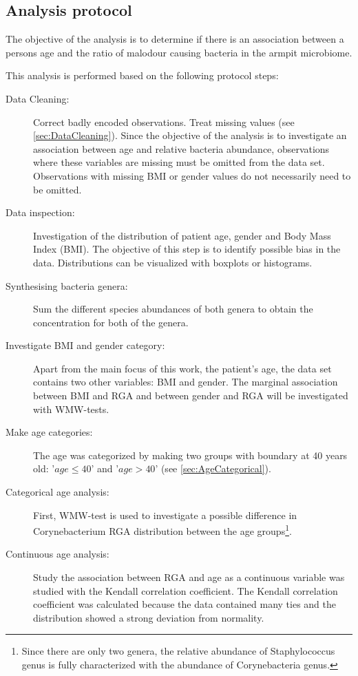 \subsection{Analysis protocol}

The objective of the analysis is to determine if there is an association between a persons age and the ratio of malodour causing bacteria in the armpit microbiome.

This analysis is performed based on the following protocol steps:

\begin{description}
    \item[Data Cleaning:] Correct badly encoded observations. Treat missing values (see \ref{sec:DataCleaning}). Since the objective of the analysis is to investigate an association between age and relative bacteria abundance, observations where these variables are missing must be omitted from the data set. Observations with missing BMI or gender values do not necessarily need to be omitted.
    \item[Data inspection: ] Investigation of the distribution of patient age, gender and Body Mass Index (BMI). 
    The objective of this step is to identify possible bias in the data. 
    Distributions can be visualized with boxplots or histograms.
    \item[Synthesising bacteria genera: ] Sum the different species abundances of both genera to obtain the concentration for both of the genera.
    \item[Investigate BMI and gender category: ] Apart from the main focus of this work, the patient's age, the data set contains two other variables: BMI and gender.
    The marginal association between BMI and RGA and between gender and RGA will be investigated with WMW-tests.
    \item[Make age categories: ] The age was categorized by making two groups with boundary at 40 years old: '$age \leq 40$' and '$age > 40$' (see \ref{sec:AgeCategorical}).
    \item[Categorical age analysis: ] First, WMW-test is used to investigate a possible difference in Corynebacterium RGA distribution between the age groups\footnote{Since there are only two genera, the relative abundance of Staphylococcus genus is fully characterized with the abundance of Corynebacteria genus.}.
    \item[Continuous age analysis: ] Study the association between RGA and age as a continuous variable was studied with the Kendall correlation coefficient. The Kendall correlation coefficient was calculated because the data contained many ties and the distribution showed a strong deviation from normality.

\end{description}
